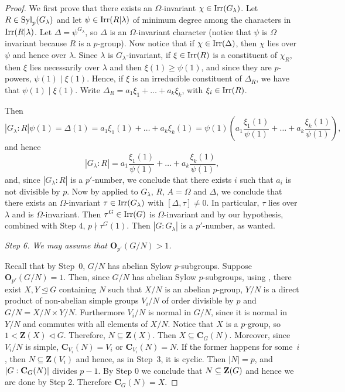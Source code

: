\documentclass[12pt]{amsart}
\theoremstyle{theorem}
\theoremstyle{definition}
\def\cent#1#2{{\bf C}_{#1}(#2)}
\def\cent#1#2{{\bf C}_{#1}(#2)}
\newcommand{\bC} {\mathbf C}
\newcommand{\bO}{{\mathbf O}}
\newcommand{\bZ} {\mathbf Z}
\begin{document}
\begin{proof}
		We first prove that there exists an $\Omega$-invariant $\chi\in{\rm Irr}(G_\lambda)$. Let $R\in{\rm Syl}_p(G_\lambda)$ and let $\psi\in{\rm Irr}(R|\lambda)$ of minimum degree among the characters in ${\rm Irr}(R|\lambda)$. Let $\Delta=\psi^{G_\lambda}$, so $\Delta$ is an $\Omega$-invariant character (notice that $\psi$ is $\Omega$ invariant because $R$ is a $p$-group). Now notice that if $\chi\in{\rm Irr}(\Delta)$, then $\chi$ lies over $\psi$ and hence over $\lambda$. Since $\lambda$ is $G_\lambda$-invariant, if $\xi\in{\rm Irr}(R)$ is a constituent of $\chi_R$, then $\xi$ lies necessarily over $\lambda$ and then $\xi(1)\geq \psi(1)$, and since they are $p$-powers, $\psi(1)\mid\xi(1)$. Hence, if $\xi$ is an irreducible constituent of $\Delta_R$, we have that $\psi(1)\mid\xi(1)$. Write $\Delta_R=a_1\xi_1+\ldots + a_k\xi_k$, with $\xi_i\in{\rm Irr}(R)$. 
		
		Then
		$$|G_\lambda:R|\psi(1)=\Delta(1)=a_1\xi_1(1)+\ldots +a_k\xi_k(1)=\psi(1)\left(a_1\frac{\xi_1(1)}{\psi(1)}+\ldots + a_k\frac{\xi_k(1)}{\psi(1)}\right),$$ and hence 
		$$|G_\lambda:R|=a_1\frac{\xi_1(1)}{\psi(1)}+\ldots + a_k\frac{\xi_k(1)}{\psi(1)},$$ and, since $|G_\lambda:R|$ is a $p'$-number, we conclude that there exists $i$ such that $a_i$ is not divisible by $p$. Now by \cite[Lemma 2.1 (i)]{NT} applied to $G_\lambda$, $R$, $A=\Omega$ and $\Delta$, we conclude that there exists an $\Omega$-invariant $\tau\in{\rm Irr}(G_\lambda)$ with $[\Delta,\tau]\neq 0$. In particular, $\tau$ lies over $\lambda$ and is $\Omega$-invariant. Then $\tau^G\in{\rm Irr}(G)$ is $\Omega$-invariant and by our hypothesis, combined with Step $4$, $p\nmid\tau^G(1)$. Then $|G:G_\lambda|$ is a $p'$-number, as wanted.
		\bigskip
		
		
		\textit{Step 6. We may assume that $\bO_{p'}(G/N)>1$.}
		\medskip
		
		Recall that by Step~0, $G/N$ has abelian Sylow $p$-subgroups. Suppose
		$\bO_{p'}(G/N)=1$. Then, since $G/N$ has abelian Sylow $p$-subgroups, using \cite[Theorem 4.1]{MinimalHeights},
		there exist $X,Y\trianglelefteq G$ containing $N$ such that $X/N$ is an abelian
		$p$-group, $Y/N$ is a direct product of non-abelian simple groups $V_i/N$ of
		order divisible by $p$ and $G/N=X/N\times Y/N$. Furthermore $V_i/N$ is normal
		in $G/N$, since it is normal in $Y/N$ and commutes with all elements of $X/N$. Notice that $X$ is a $p$-group, so $1<\bZ(X)\lhd G$. Therefore,
		$N\subseteq\bZ(X)$. Then $X\subseteq \bC_G(N)$. Moreover, since $V_i/N$ is
		simple, $\bC_{V_i}(N)=V_i$ or $\bC_{V_i}(N)=N$. If the former happens for
		some~$i$, then $N\subseteq \bZ(V_i)$ and hence, as in Step~3, it is cyclic.
		Then $|N|=p$, and $|G:\cent G N|$ divides $p-1$. By Step 0 we conclude that $N\subseteq {\rm\textbf{Z}}(G)$ and hence we are done by Step 2. Therefore $\bC_{G}(N)=X$.
		\medskip
		

\end{proof}
\end{document}
